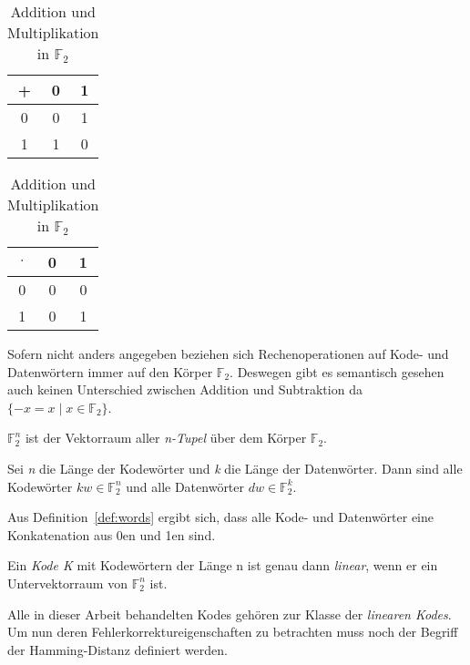 \begin{table}[!h]
\begin{center}
\begin{tabular}{c|cc}
+ & 0 & 1 \\
\hline
0 & 0 & 1 \\
1 & 1 & 0 \\
\end{tabular}
\hspace{2cm}
\begin{tabular}{c|cc}
$\cdot$ & 0 & 1 \\
\hline
0 & 0 & 0 \\
1 & 0 & 1 \\
\end{tabular}
\caption{Addition und Multiplikation in $\mathbb{F}_2$}
\label{table:addmul}
\end{center}
\end{table}

Sofern nicht anders angegeben beziehen sich Rechenoperationen auf Kode- und Datenwörtern immer auf den Körper $\mathbb{F}_2$. Deswegen gibt es semantisch gesehen auch keinen Unterschied zwischen Addition und Subtraktion da $\{-x = x \mid x \in \mathbb{F}_2\}$.\cite[S. 2ff]{huffman2010fundamentals}

\begin{t_def}
$\mathbb{F}_{2}^{n}$ ist der Vektorraum aller {\em n-Tupel} über dem Körper $\mathbb{F}_2$.
\end{t_def}

\begin{t_def}
\label{def:words}
Sei {\em n} die Länge der Kodewörter und {\em k} die Länge der Datenwörter. Dann sind alle Kodewörter $kw \in \mathbb{F}_{2}^{n}$ und alle Datenwörter $dw \in \mathbb{F}_{2}^{k}$.
\end{t_def}

Aus Definition~\ref{def:words} ergibt sich, dass alle Kode- und Datenwörter eine Konkatenation aus 0en und 1en sind.


\begin{t_def}
Ein {\em Kode K} mit Kodewörtern der Länge n ist genau dann {\em linear}, wenn er ein Untervektorraum von $\mathbb{F}_{2}^{n}$ ist.
\end{t_def}

Alle in dieser Arbeit behandelten Kodes gehören zur Klasse der \textit{linearen Kodes}.\cite[S. 3ff]{huffman2010fundamentals} Um nun deren Fehlerkorrektureigenschaften zu betrachten muss noch der Begriff der Hamming-Distanz definiert werden.

